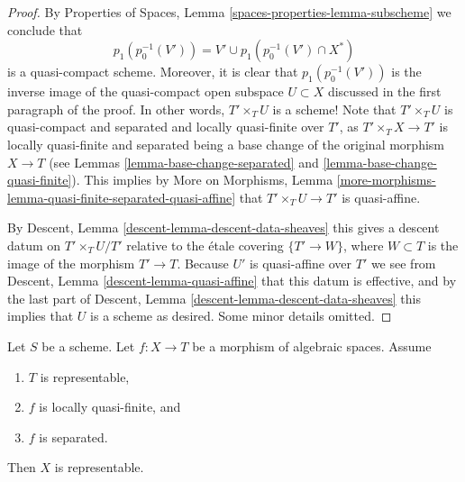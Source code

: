 \begin{proof}
\medskip\noindent
By
Properties of Spaces, Lemma \ref{spaces-properties-lemma-subscheme}
we conclude that
$$
p_1(p_0^{-1}(V')) =
V' \cup p_1(p_0^{-1}(V') \cap X^*)
$$
is a quasi-compact scheme. Moreover, it is clear that
$p_1(p_0^{-1}(V'))$ is the inverse image of the
quasi-compact open subspace $U \subset X$ discussed in the
first paragraph of the proof. In other words, $T' \times_T U$ is a scheme!
Note that $T' \times_T U$ is quasi-compact and
separated and locally quasi-finite over $T'$, as
$T' \times_T X \to T'$ is locally quasi-finite and separated
being a base change of the original morphism $X \to T$ (see
Lemmas \ref{lemma-base-change-separated} and
\ref{lemma-base-change-quasi-finite}).
This implies by
More on Morphisms,
Lemma \ref{more-morphisms-lemma-quasi-finite-separated-quasi-affine}
that $T' \times_T U \to T'$ is quasi-affine.

\medskip\noindent
By
Descent, Lemma \ref{descent-lemma-descent-data-sheaves}
this gives a descent datum on $T' \times_T U / T'$
relative to the \'etale covering $\{T' \to W\}$, where $W \subset T$
is the image of the morphism $T' \to T$.
Because $U'$ is quasi-affine over $T'$ we see from
Descent, Lemma \ref{descent-lemma-quasi-affine}
that this datum is effective, and by the last part of
Descent, Lemma \ref{descent-lemma-descent-data-sheaves}
this implies that $U$ is a scheme as desired.
Some minor details omitted.
\end{proof}

\begin{proposition}
\label{proposition-locally-quasi-finite-separated-over-scheme}
Let $S$ be a scheme.
Let $f : X \to T$ be a morphism of algebraic spaces.
Assume
\begin{enumerate}
\item $T$ is representable,
\item $f$ is locally quasi-finite, and
\item $f$ is separated.
\end{enumerate}
Then $X$ is representable.
\end{proposition}


